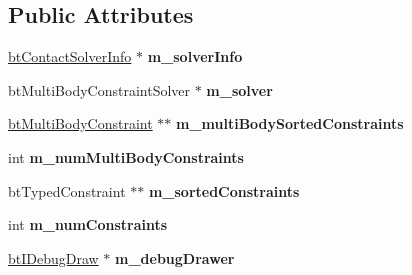 \subsection*{Public Attributes}
\begin{DoxyCompactItemize}
\item 
\mbox{\label{structMultiBodyInplaceSolverIslandCallback_a97088115fb4f0c96a71ccdcdd404176a}} 
\hyperlink{structbtContactSolverInfo}{bt\+Contact\+Solver\+Info} $\ast$ {\bfseries m\+\_\+solver\+Info}
\item 
\mbox{\label{structMultiBodyInplaceSolverIslandCallback_affca477e35f6360d87bfb02471c33c8b}} 
bt\+Multi\+Body\+Constraint\+Solver $\ast$ {\bfseries m\+\_\+solver}
\item 
\mbox{\label{structMultiBodyInplaceSolverIslandCallback_ac0118bc50ed01ddfd2486b8f2029ddb7}} 
\hyperlink{classbtMultiBodyConstraint}{bt\+Multi\+Body\+Constraint} $\ast$$\ast$ {\bfseries m\+\_\+multi\+Body\+Sorted\+Constraints}
\item 
\mbox{\label{structMultiBodyInplaceSolverIslandCallback_af6a86737e6f7d8aa0b6eecb96debff20}} 
int {\bfseries m\+\_\+num\+Multi\+Body\+Constraints}
\item 
\mbox{\label{structMultiBodyInplaceSolverIslandCallback_a8faedc7e6997edece13c1d43d8e2c72b}} 
bt\+Typed\+Constraint $\ast$$\ast$ {\bfseries m\+\_\+sorted\+Constraints}
\item 
\mbox{\label{structMultiBodyInplaceSolverIslandCallback_a9dfeb52eb5c0e0f4b5a42c41df0a359c}} 
int {\bfseries m\+\_\+num\+Constraints}
\item 
\mbox{\label{structMultiBodyInplaceSolverIslandCallback_ad610ed43d22e0d2a7c2c656f056fc6e9}} 
\hyperlink{classbtIDebugDraw}{bt\+I\+Debug\+Draw} $\ast$ {\bfseries m\+\_\+debug\+Drawer}
\item 
\mbox{\label{structMultiBodyInplaceSolverIslandCallback_ac8cfb422a95e2c160925f3737538e7dd}} 

\end{DoxyCompactItemize}
